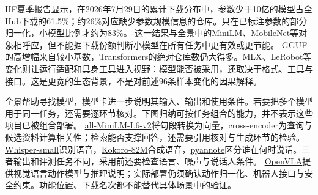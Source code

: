 HF夏季报告显示，在2026年7月29日的累计下载分布中，参数少于10亿的模型占全Hub下载的61.5\%；约26\%对应缺少参数规模信息的仓库。只在已标注参数的部分归一化，小模型比例才约为83\%。
这一结果与全景中的MiniLM、MobileNet等对象相呼应，但不能据下载份额判断小模型在所有任务中更有效或更节能。
GGUF的高增幅来自较小基数，Transformers的绝对仓库数仍大得多。MLX、LeRobot等变化则让运行适配和具身工具进入视野：模型能否被采用，还取决于格式、工具与接口。这是更宽的生态背景，不是对前述96条样本变化的因果解释。

全景帮助寻找模型，模型卡进一步说明其输入、输出和使用条件。若要把多个模型用于同一任务，还需要逐环节核对。下图归纳可按任务组合的能力，并不表示这些项目已被组合部署。
\href{https://huggingface.co/sentence-transformers/all-MiniLM-L6-v2}{all-MiniLM-L6-v2}将句段转换为向量，cross-encoder为查询与候选资料计算相关性；检索能否支撑回答，还需要引用核对与生成环节的检验。
\href{https://huggingface.co/openai/whisper-small}{Whisper-small}识别语音，\href{https://huggingface.co/hexgrad/Kokoro-82M/blob/f3ff3571791e39611d31c381e3a41a3af07b4987/README.md}{Kokoro-82M}合成语音，\href{https://huggingface.co/pyannote/speaker-diarization-3.1/blob/84fd25912480287da0247647c3d2b4853cb3ee5d/README.md}{pyannote}区分谁在何时说话。三者输出和评测任务不同，采用前还要检查语言、噪声与说话人条件。
\href{https://huggingface.co/openvla/openvla-7b}{OpenVLA}提供视觉语言动作模型与推理说明；实际部署仍须确认动作归一化、机器人接口与安全约束。功能位置、下载名次都不能替代具体场景中的验证。

